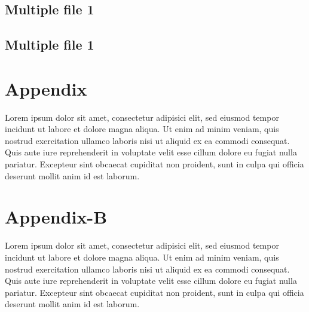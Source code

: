 \documentclass[a4paper, oneside]{book}
\begin{document}
\section{Multiple file 1}


\section{Multiple file 1}

\printbibliography
 
\appendix
\chapter{Appendix}
Lorem ipsum dolor sit amet, consectetur adipisici elit, sed eiusmod tempor incidunt ut labore et dolore magna aliqua. Ut enim ad minim veniam, quis nostrud exercitation ullamco laboris nisi ut aliquid ex ea commodi consequat. Quis aute iure reprehenderit in voluptate velit esse cillum dolore eu fugiat nulla pariatur. Excepteur sint obcaecat cupiditat non proident, sunt in culpa qui officia deserunt mollit anim id est laborum.

\chapter{Appendix-B}
Lorem ipsum dolor sit amet, consectetur adipisici elit, sed eiusmod tempor incidunt ut labore et dolore magna aliqua. Ut enim ad minim veniam, quis nostrud exercitation ullamco laboris nisi ut aliquid ex ea commodi consequat. Quis aute iure reprehenderit in voluptate velit esse cillum dolore eu fugiat nulla pariatur. Excepteur sint obcaecat cupiditat non proident, sunt in culpa qui officia deserunt mollit anim id est laborum.

\end{document}
